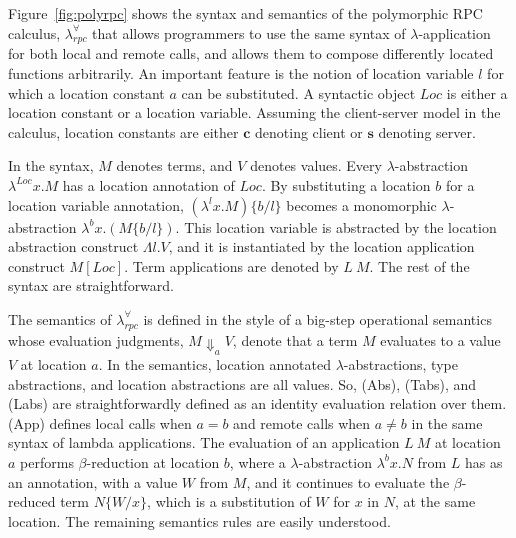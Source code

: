 \documentclass[a4paper]{article}
\theoremstyle{plain}
\theoremstyle{definition}
\newcommand{\polyrpc}{$\lambda_{rpc}^{\forall}$\xspace}
\newcommand{\client}{\textbf{c}}
\newcommand{\server}{\textbf{s}}
\newcommand{\evalRPC}[3]{#1\Downarrow_{#2}#3}
\newcommand{\lamL}[3]{\lambda^{#1}#2.#3}
\newcommand{\subst}[2]{\{#1/#2\}}
\newcommand{\Loc}{Loc}
\begin{document}
Figure~\ref{fig:polyrpc} shows the syntax and semantics of the
polymorphic RPC calculus, {\polyrpc} that allows programmers to use
the same syntax of $\lambda$-application for both local and remote
calls, and allows them to compose differently located functions
arbitrarily.
%
An important feature is the notion of location variable $l$ for which
a location constant $a$ can be substituted.
%
A syntactic object $\Loc$ is either a location constant or a location
variable.
%
Assuming the client-server model in the calculus, location constants
are either $\client$ denoting client or $\server$ denoting server.

In the syntax, $M$ denotes terms, and $V$ denotes values.
%
Every $\lambda$-abstraction $\lamL{\Loc}{x}{M}$ has a location
annotation of $\Loc$.
%
By substituting a location $b$ for a location variable annotation,
$(\lamL{l}{x}{M})\subst{b}{l}$ becomes a monomorphic
$\lambda$-abstraction $\lamL{b}{x}{(M\subst{b}{l})}$.
%
This location variable is abstracted by the location abstraction
construct $\Lambda l.V$, and it is instantiated by the location
application construct $M[\Loc]$.
%
Term applications are denoted by $L \ M$.  The rest of the syntax are
straightforward.

The semantics of {\polyrpc} is defined in the style of a big-step
operational semantics whose evaluation judgments, $\evalRPC{M}{a}{V}$,
denote that a term $M$ evaluates to a value $V$ at location $a$.
%
In the semantics, location annotated $\lambda$-abstractions, type
abstractions, and location abstractions are all values.
%
So, (Abs), (Tabs), and (Labs) are straightforwardly defined as an
identity evaluation relation over them.
%
(App) defines local calls when $a=b$ and remote calls when $a\not=b$
in the same syntax of lambda applications.
%
The evaluation of an application $L \ M$ at location $a$ performs
$\beta$-reduction at location $b$, where a $\lambda$-abstraction
$\lamL{b}{x}{N}$ from $L$ has as an annotation, with a value $W$ from
$M$, and it continues to evaluate the $\beta$-reduced term
$N\subst{W}{x}$, which is a substitution of $W$ for $x$ in $N$, at the
same location.
%
The remaining semantics rules are easily understood.
\end{document}
